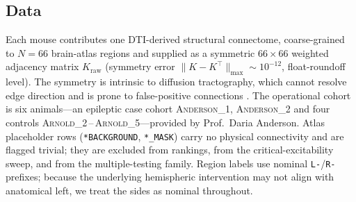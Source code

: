 \documentclass[11pt,a4paper]{article}
\begin{document}
\subsection{Data}
Each mouse contributes one DTI-derived structural connectome, coarse-grained to $N=66$ brain-atlas
regions and supplied as a symmetric $66\times 66$ weighted adjacency matrix $K_{\mathrm{raw}}$
(symmetry error $\lVert K-K^{\top}\rVert_{\max}\sim 10^{-12}$, float-roundoff level). The symmetry is intrinsic to diffusion tractography, which cannot resolve edge
direction and is prone to false-positive connections \citep{maierhein2017}. The operational
cohort is six animals---an epileptic case cohort \textsc{Anderson\_1}, \textsc{Anderson\_2} and four
controls \textsc{Arnold\_2}\,--\,\textsc{Arnold\_5}---provided by Prof.\ Daria Anderson. Atlas
placeholder rows (\texttt{*BACKGROUND}, \texttt{*\_MASK}) carry no physical connectivity and are
flagged trivial; they are excluded from rankings, from the critical-excitability sweep, and from the
multiple-testing family. Region labels use nominal \texttt{L-}/\texttt{R-} prefixes; because the
underlying hemispheric intervention may not align with anatomical left, we treat the sides as nominal
throughout.
\end{document}
